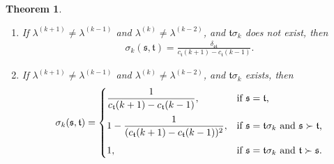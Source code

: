 \documentclass[11pt,a4paper,reqno,svgnames]{amsart}
\theoremstyle{plain}
\newtheorem{theorem}{Theorem}[section]
\theoremstyle{definition}
\numberwithin{equation}{section}
\begin{document}
\begin{theorem}
\begin{enumerate}[label=(\arabic{*}), ref=\arabic{*},leftmargin=0pt,itemindent=1.5em]
\begin{align}
\end{align}
\item\label{sigmaodd.4}  If $\lambda^{(k+1)}\neq\lambda^{(k-1)}$ and $\lambda^{(k)}\neq\lambda^{(k-2)}$, and $\mathfrak{t}\sigma_{k}$ does not exist, then 
\begin{align}\label{sigmaodd.4.1} 
\sigma_{k}(\mathfrak{s},\mathfrak{t})=
\frac{\delta_\mathfrak{st}}{c_\mathfrak{t}(k+1)-c_\mathfrak{t}(k-1)}.
\end{align}
\item\label{sigmaodd.5} If $\lambda^{(k+1)}\neq\lambda^{(k-1)}$ and $\lambda^{(k)}\neq\lambda^{(k-2)}$, and $\mathfrak{t}\sigma_{k}$ exists, then 
\begin{align}\label{sigmaodd.5.1}
\sigma_{k}(\mathfrak{s},\mathfrak{t})=
\begin{cases}
{\displaystyle\frac{1}{c_\mathfrak{t}(k+1)-c_\mathfrak{t}(k-1)},}&\text{if $\mathfrak{s}=\mathfrak{t}$,}\medskip\\
1-{\displaystyle\frac{1}{(c_\mathfrak{t}(k+1)-c_\mathfrak{t}(k-1))^2}},
&\text{if $\mathfrak{s}=\mathfrak{t}\sigma_{k}$ and $\mathfrak{s}\succ\mathfrak{t}$,}\medskip\\
1, &\text{if $\mathfrak{s}=\mathfrak{t}\sigma_{k}$ and $\mathfrak{t}\succ\mathfrak{s}$.}
\end{cases}
\end{align}
\end{enumerate}
\end{theorem}
\end{document}
